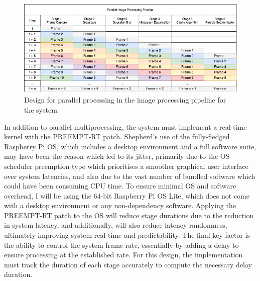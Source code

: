 \begin{figure}[H]
    \centering
    \includegraphics[width=1\textwidth]{assets/image_multiprocessing_pipeline.png}
    \caption{Design for parallel processing in the image processing pipeline for the system.}
    \label{fig:multiprocessing_pipeline}
\end{figure}

In addition to parallel multiprocessing, the system must implement a real-time kernel with the PREEMPT-RT patch. Shepherd's use of the fully-fledged Raspberry Pi OS, which includes a desktop environment and a full software suite, may have been the reason which led to its jitter, primarily due to the OS scheduler preemption type which prioritises a smoother graphical user interface over system latencies, and also due to the vast number of bundled software which could have been consuming CPU time. To ensure minimal OS and software overhead, I will be using the 64-bit Raspberry Pi OS Lite, which does not come with a desktop environment or any non-dependency software. Applying the PREEMPT-RT patch to the OS will reduce stage durations due to the reduction in system latency, and additionally, will also reduce latency randomness, ultimately improving system real-time and predictability. The final key factor is the ability to control the system frame rate, essentially by adding a delay to ensure processing at the established rate. For this design, the implementation must track the duration of each stage accurately to compute the necessary delay duration.
